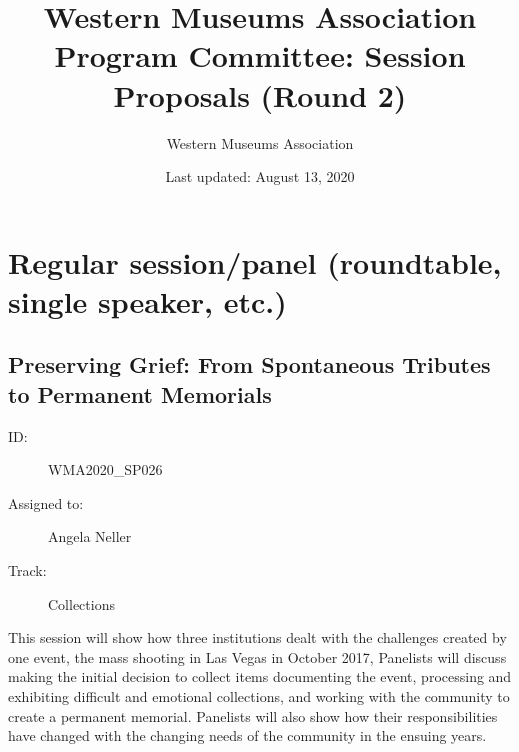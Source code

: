 \documentclass{report}
\title{ Western Museums Association Program Committee: Session Proposals (Round 2)}
\date{ Last updated: August 13, 2020}
\author{Western Museums Association}
\begin{document}
  \maketitle
  \newpage
  \tableofcontents
  \newpage
  
    \newpage
    \chapter*{ Regular session/panel (roundtable, single speaker, etc.) }

      
        
          \newpage
          \section{ Preserving Grief: From Spontaneous Tributes to Permanent Memorials }
            \begin{description}
              \item [ID:]
              WMA2020\_SP026

              \item [Assigned to:]Angela Neller~
                \item [Track:]Collections~
              \end{description}

              This session will show how three institutions dealt with the challenges created by one event, the mass shooting in Las Vegas in October 2017, Panelists will discuss making the initial decision to collect items documenting the event, processing and exhibiting  difficult and emotional collections, and working with the community to create a permanent memorial. Panelists will also show how their responsibilities have changed with the changing needs of the community in the ensuing years.
\end{document}
